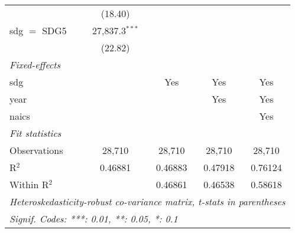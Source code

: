 \begin{tabular}{lcccc}
                 & (18.40)          &                  &                  &   \\   
   sdg $=$ SDG5  & 27,837.3$^{***}$ &                  &                  &   \\   
                 & (22.82)          &                  &                  &   \\   
   \midrule
   \emph{Fixed-effects}\\
   sdg           &                  & Yes              & Yes              & Yes\\  
   year          &                  &                  & Yes              & Yes\\  
   naics         &                  &                  &                  & Yes\\  
   \midrule
   \emph{Fit statistics}\\
   Observations  & 28,710           & 28,710           & 28,710           & 28,710\\  
   R$^2$         & 0.46881          & 0.46883          & 0.47918          & 0.76124\\  
   Within R$^2$  &                  & 0.46861          & 0.46538          & 0.58618\\  
   \midrule \midrule
   \multicolumn{5}{l}{\emph{Heteroskedasticity-robust co-variance matrix, t-stats in parentheses}}\\
   \multicolumn{5}{l}{\emph{Signif. Codes: ***: 0.01, **: 0.05, *: 0.1}}\\
\end{tabular}
\par\endgroup


